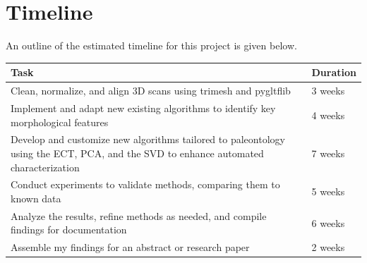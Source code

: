 \documentclass[12pt]{article}
\begin{document}
\section{Timeline}
An outline of the estimated timeline for this project is given below.


\begin{table}[h!]
\centering
\setlength{\tabcolsep}{10pt}
\renewcommand{\arraystretch}{1}
\begin{tabular}{|p{12cm}|p{2.5cm}|}
\hline
\textbf{Task} & \textbf{Duration} \\
\hline
Clean, normalize, and align 3D scans using trimesh and pygltflib & 3 weeks \\
Implement and adapt new existing algorithms to identify key morphological
features & 4 weeks \\
Develop and customize new algorithms tailored to paleontology using the ECT,
PCA, and the SVD to enhance automated characterization & 7 weeks \\
Conduct experiments to validate methods, comparing them to known data & 5 weeks \\
Analyze the results, refine methods as needed, and compile findings for
documentation & 6 weeks \\
Assemble my findings for an abstract or research paper & 2 weeks \\
\hline
\end{tabular}
\end{table}
\end{document}
